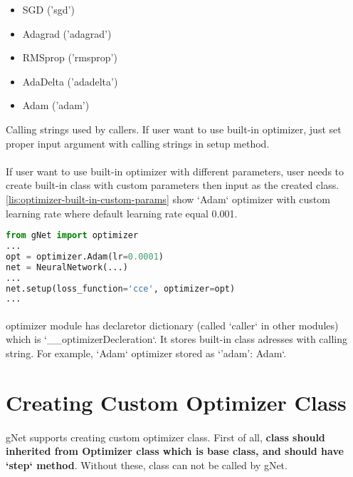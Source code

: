 \documentclass[12pt]{report}
\begin{document}
\begin{itemize}
	\item SGD ('sgd')
	\item Adagrad ('adagrad')
	\item RMSprop ('rmsprop')
	\item AdaDelta ('adadelta')
	\item Adam ('adam')
\end{itemize}

Calling strings used by callers. If user want to use built-in optimizer, just set proper input argument with calling strings in setup method. 

\paragraph{}
If user want to use built-in optimizer with different parameters, user needs to create built-in class with custom parameters then input as the created class. \ref{lis:optimizer-built-in-custom-params} show `Adam` optimizer with custom learning rate where default learning rate equal 0.001.


\begin{lstlisting}[language=Python, numbers=none, caption={Built-in optimizer with custom parameters.}, label={lis:optimizer-built-in-custom-params}]
from gNet import optimizer
...
opt = optimizer.Adam(lr=0.0001)
net = NeuralNetwork(...)
...
net.setup(loss_function='cce', optimizer=opt)
...
\end{lstlisting}

\paragraph{}
optimizer module has declaretor dictionary (called `caller` in other modules) which is `\_\_optimizerDecleration`. It stores built-in class adresses with calling string. For example, `Adam` optimizer stored as `'adam': Adam`.

\section{Creating Custom Optimizer Class}

\paragraph{}
gNet supports creating custom optimizer class. First of all, \textbf{class should inherited from Optimizer class which is base class, and should have `step` method}. Without these, class can not be called by gNet. 
\end{document}
